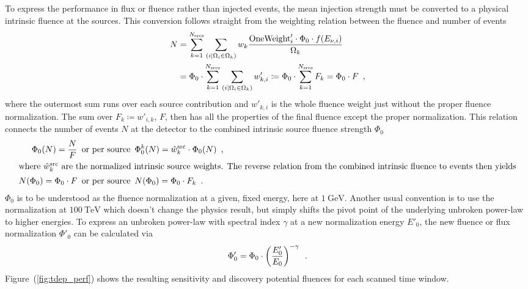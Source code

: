 To express the performance in flux or fluence rather than injected events, the mean injection strength must be converted to a physical intrinsic fluence at the sources.
This conversion follows straight from the weighting relation between the fluence and number of events
\begin{align}
  \label{equ:raw_flux}
  N &= \sum_{k=1}^{N_\text{srcs}} \sum_{(i|\Omega_i \in \Omega_k)}
    w_k\frac{\text{OneWeight}'_i\cdot\Phi_0\cdot f(E_{\nu,i})}{\Omega_k} \\
  &= \Phi_0 \cdot
      \sum_{k=1}^{N_\text{srcs}}
      \sum_{(i|\Omega_i \in \Omega_k)} w'_{k,i}
  \coloneqq \Phi_0 \cdot \sum_{k=1}^{N_\text{srcs}} F_k = \Phi_0 \cdot F
  \enspace\text{,}
\end{align}
where the outermost sum runs over each source contribution and $w'_{k,i}$ is the whole fluence weight just without the proper fluence normalization.
The sum over $F_k \coloneqq w'_{i,k}$, $F$, then has all the properties of the final fluence except the proper normalization.
This relation connects the number of events $N$ at the detector to the combined intrinsic source fluence strength $\Phi_0$
\begin{align}
  \label{equ:flux_to_mu}
  \Phi_0(N) = \frac{N}{F}
    &\enspace\text{or per source}\enspace
    \Phi_0^k(N) = \hat{w}_k^\text{src} \cdot \Phi_0(N)
    \enspace\text{,} \\
  \intertext{where $\hat{w}_k^\text{src}$ are the normalized intrinsic source weights. The reverse relation from the combined intrinsic fluence to events then yields}
  N(\Phi_0) = \Phi_0 \cdot F
    &\enspace\text{or per source}\enspace
    N(\Phi_0) = \Phi_0 \cdot F_k
  \enspace\text{.}
\end{align}
$\Phi_0$ is to be understood as the fluence normalization at a given, fixed energy, here at $\SI{1}{\GeV}$.
Another usual convention is to use the normalization at $\SI{100}{\TeV}$ which doesn't change the physics result, but simply shifts the pivot point of the underlying unbroken power-law to higher energies.
To express an unbroken power-law with spectral index $\gamma$ at a new normalization energy $E'_0$, the new fluence or flux normalization $\Phi'_0$ can be calculated via
\begin{equation}
  \Phi'_0 = \Phi_0 \cdot \left(\frac{E'_0}{E_0}\right)^{-\gamma}
  \enspace\text{.}
\end{equation}
Figure~(\ref{fig:tdep_perf}) shows the resulting sensitivity and discovery potential fluences for each scanned time window.

